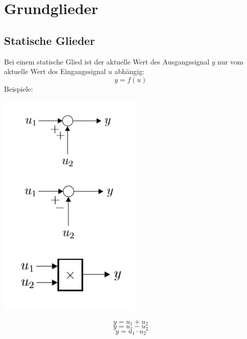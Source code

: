 \section{Grundglieder}
\subsection{Statische Glieder}
Bei einem statische Glied ist der aktuelle Wert des Ausgangssignal $y$ nur vom aktuelle Wert des Eingangssignal $u$ abhängig:
\[y = f(u)\]
Beispiele:
\begin{center}
	\begin{minipage}{0.10\textwidth}
		\includegraphics[width=\linewidth,keepaspectratio=true]{Images/statischeglieder}
	\end{minipage}%
	\begin{minipage}{0.3\textwidth}
		\[y = u_1 + u_2 \]
		\[y = u_1 - u_2 \]
		\[y = u_1 \cdot u_2 \]
	\end{minipage}
\end{center}

